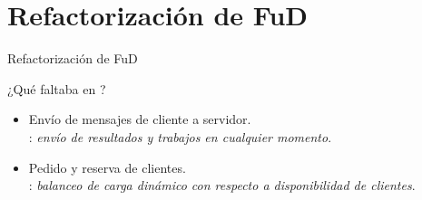\section{Refactorización de FuD}

\begin{frame}{Refactorización de FuD}

        \centering

    \vspace{0.5cm}
    \pause
    \begin{center}
        \begin{Large}¿Qué faltaba en \fud{}?\end{Large}
        \vspace{0.7cm}
        \pause
        \begin{itemize}
            \item  Envío de mensajes de cliente a servidor.\\ \rc: \textit{envío de resultados y trabajos en cualquier momento}.
            \vspace{0.2cm}
            \pause
            \item  Pedido y reserva de clientes.\\ \rc: \textit{balanceo de carga dinámico con respecto a disponibilidad de clientes}.
        \end{itemize}

    \end{center}

\end{frame}


